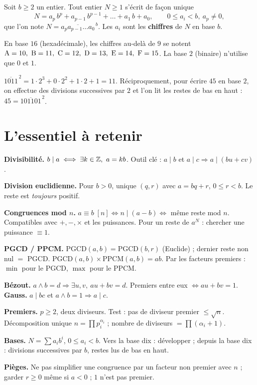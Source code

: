 \begin{definition}
Soit $b\ge 2$ un entier. Tout entier $N\ge 1$ s'écrit de façon unique
\[
N=a_{p}\,b^{p}+a_{p-1}\,b^{p-1}+\dots+a_{1}\,b+a_{0},\qquad 0\le a_{i}<b,\ a_{p}\neq 0,
\]
que l'on note $N=\overline{a_{p}a_{p-1}\dots a_{0}}^{\,b}$. Les $a_i$ sont les \textbf{chiffres} de $N$ en base $b$.
\end{definition}

\begin{remarque}
En base $16$ (hexadécimale), les chiffres au-delà de $9$ se notent $\text A=10,\ \text B=11,\ \text C=12,\ \text D=13,\ \text E=14,\ \text F=15$. La base $2$ (binaire) n'utilise que $0$ et $1$.
\end{remarque}

\begin{exemple}
$\overline{1011}^{\,2}=1\cdot 2^{3}+0\cdot 2^{2}+1\cdot 2+1=11$. Réciproquement, pour écrire $45$ en base $2$, on effectue des divisions successives par $2$ et l'on lit les restes de bas en haut : $45=\overline{101101}^{\,2}$.
\end{exemple}

\section{L'essentiel à retenir}

\begin{synthese}
\textbf{Divisibilité.} $b\mid a \iff \exists k\in\mathbb{Z},\ a=kb$. Outil clé : $a\mid b$ et $a\mid c \Rightarrow a\mid(bu+cv)$.

\smallskip
\textbf{Division euclidienne.} Pour $b>0$, unique $(q,r)$ avec $a=bq+r$, $0\le r<b$. Le reste est \emph{toujours} positif.

\smallskip
\textbf{Congruences mod $n$.} $a\equiv b\;[n]\iff n\mid(a-b)\iff$ même reste mod $n$. Compatibles avec $+,-,\times$ et les puissances. Pour un reste de $a^N$ : chercher une puissance $\equiv 1$.

\smallskip
\textbf{PGCD / PPCM.}
$\mathrm{PGCD}(a,b)=\mathrm{PGCD}(b,r)$ (Euclide) ; dernier reste non nul $=$ PGCD.
$\mathrm{PGCD}(a,b)\times\mathrm{PPCM}(a,b)=ab$.
Par les facteurs premiers : $\min$ pour le PGCD, $\max$ pour le PPCM.

\smallskip
\textbf{Bézout.} $a\wedge b=d \Rightarrow \exists u,v,\ au+bv=d$. Premiers entre eux $\iff au+bv=1$.
\textbf{Gauss.} $a\mid bc$ et $a\wedge b=1 \Rightarrow a\mid c$.

\smallskip
\textbf{Premiers.} $p\ge2$, deux diviseurs. Test : pas de diviseur premier $\le\sqrt n$. Décomposition unique $n=\prod p_i^{\alpha_i}$ ; nombre de diviseurs $=\prod(\alpha_i+1)$.

\smallskip
\textbf{Bases.} $N=\sum a_i b^i$, $0\le a_i<b$. Vers la base dix : développer ; depuis la base dix : divisions successives par $b$, restes lus de bas en haut.

\smallskip
\textbf{Pièges.} Ne pas simplifier une congruence par un facteur non premier avec $n$ ; garder $r\ge 0$ même si $a<0$ ; $1$ n'est pas premier.
\end{synthese}

